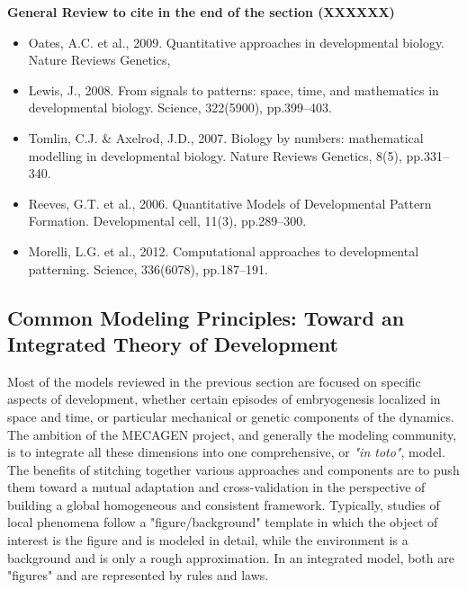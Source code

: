 \textbf{General Review to cite in the end of the section (XXXXXX)}
\begin{itemize}
	\item Oates, A.C. et al., 2009. Quantitative approaches in developmental biology. Nature Reviews Genetics, \cite{Oates:2009kg}
	\item Lewis, J., 2008. From signals to patterns: space, time, and mathematics in developmental biology. Science, 322(5900), pp.399–403. \cite{Lewis:2008kx}
	\item Tomlin, C.J. \& Axelrod, J.D., 2007. Biology by numbers: mathematical modelling in developmental biology. Nature Reviews Genetics, 8(5), pp.331–340. \cite{Tomlin:2007gq}
	\item Reeves, G.T. et al., 2006. Quantitative Models of Developmental Pattern Formation. Developmental cell, 11(3), pp.289–300. \cite{Reeves:2006bm}
	\item Morelli, L.G. et al., 2012. Computational approaches to developmental patterning. Science, 336(6078), pp.187–191. \cite{Morelli:2012ht}
\end{itemize}

\subsection{Common Modeling Principles: Toward an Integrated Theory of Development }

  Most of the models reviewed in the previous section are focused on specific aspects of development, whether certain episodes of embryogenesis localized in space and time, or particular mechanical or genetic components of the dynamics. The ambition of the MECAGEN project, and generally the modeling community, is to integrate all these dimensions into one comprehensive, or \textit{"in toto"}, model. The benefits of stitching together various approaches and components are to push them toward a mutual adaptation and cross-validation in the perspective of building a global homogeneous and consistent framework. Typically, studies of local phenomena follow a "figure/background" template in which the object of interest is the figure and is modeled in detail, while the environment is a background and is only a rough approximation. In an integrated model, both are "figures" and are represented by rules and laws.  

